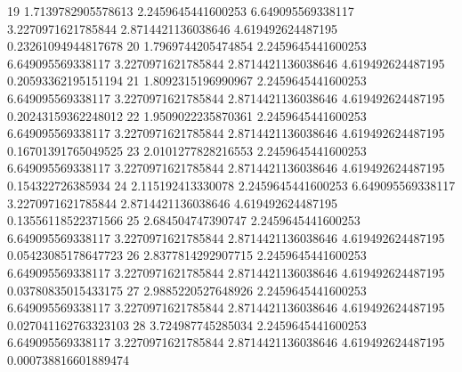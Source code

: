 {19 1.7139782905578613 2.2459645441600253 6.649095569338117 3.2270971621785844 2.8714421136038646 4.619492624487195 0.23261094944817678
20 1.7969744205474854 2.2459645441600253 6.649095569338117 3.2270971621785844 2.8714421136038646 4.619492624487195 0.20593362195151194
21 1.8092315196990967 2.2459645441600253 6.649095569338117 3.2270971621785844 2.8714421136038646 4.619492624487195 0.20243159362248012
22 1.9509022235870361 2.2459645441600253 6.649095569338117 3.2270971621785844 2.8714421136038646 4.619492624487195 0.16701391765049525
23 2.0101277828216553 2.2459645441600253 6.649095569338117 3.2270971621785844 2.8714421136038646 4.619492624487195 0.154322726385934
24 2.115192413330078 2.2459645441600253 6.649095569338117 3.2270971621785844 2.8714421136038646 4.619492624487195 0.13556118522371566
25 2.684504747390747 2.2459645441600253 6.649095569338117 3.2270971621785844 2.8714421136038646 4.619492624487195 0.05423085178647723
26 2.8377814292907715 2.2459645441600253 6.649095569338117 3.2270971621785844 2.8714421136038646 4.619492624487195 0.03780835015433175
27 2.9885220527648926 2.2459645441600253 6.649095569338117 3.2270971621785844 2.8714421136038646 4.619492624487195 0.027041162763323103
28 3.724987745285034 2.2459645441600253 6.649095569338117 3.2270971621785844 2.8714421136038646 4.619492624487195 0.000738816601889474
}\tableexpivwaitmsciedawexc
